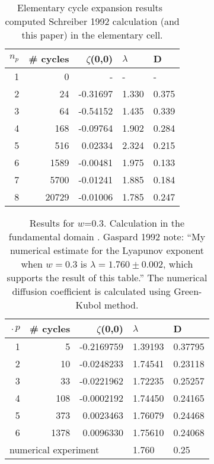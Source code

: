 
\begin{table}[htbp]
	\centering
	\begin{tabular}{|r|r|r|l|l|}
		\hline
		${n_p}$ & \# cycles & $\zeta$(0,0) & $\lambda$ & D \\
		\hline\hline
		1      & 0      &   -    &   -  &   - \\
		2      & 24     & -0.31697 & 1.330 & 0.375\\
		3      & 64     & -0.54152 & 1.435 & 0.339\\
		4      & 168    & -0.09764 & 1.902 & 0.284\\
		5      & 516    &  0.02334 & 2.324 & 0.215\\
		6      & 1589   & -0.00481 & 1.975 & 0.133\\
		7      & 5700   & -0.01241 & 1.885 & 0.184\\
		8      & 20729  & -0.01006 & 1.785 & 0.247\\ \hline
	\end{tabular}
	\caption[Elementary cell cycle expansion results of diffusion
	coefficient]{\label{TCELL1}
		Elementary cycle expansion results~ computed
		Schreiber 1992 calculation (and this paper) in the
		elementary cell.}
\end{table}


\begin{table}[htbp]
	\centering
	\begin{tabular}{|r|r|r|l|l|}
		\hline
		$\period{p}$ & \# cycles & $\zeta$(0,0) & $\lambda$ & D \\
		\hline\hline
		1      & 5      & -0.2169759 & 1.39193 & 0.37795 \\
		2      & 10     & -0.0248233 & 1.74541 & 0.23118 \\
		3      & 33     & -0.0221962 & 1.72235 & 0.25257 \\
		4      & 108    & -0.0002192 & 1.74450 & 0.24165 \\
		5      & 373    &  0.0023463 & 1.76079 & 0.24468 \\
		6      & 1378   &  0.0096330 & 1.75610 & 0.24068 \\
		\hline\hline
		\multicolumn{3}{|l|}{numerical experiment}
		& 1.760   & 0.25
		\\ \hline
	\end{tabular}
	\caption[Fundamental domain cycle expansion results of diffusion
	coefficient]{\label{TCELL2}
		Results for $w$=0.3. Calculation in the fundamental domain .
		Gaspard
		1992 note: ``My
		numerical estimate for the Lyapunov exponent when $w=0.3$ is
		$\lambda = 1.760 \pm 0.002$, which supports the result of this
		table.'' The numerical diffusion coefficient is calculated
		using
		Green-Kubol method.
	}
\end{table}



